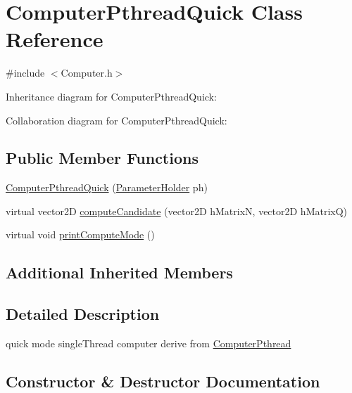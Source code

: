 \hypertarget{classComputerPthreadQuick}{}\section{Computer\+Pthread\+Quick Class Reference}
\label{classComputerPthreadQuick}


{\ttfamily \#include $<$Computer.\+h$>$}



Inheritance diagram for Computer\+Pthread\+Quick\+:


Collaboration diagram for Computer\+Pthread\+Quick\+:
\subsection*{Public Member Functions}
\begin{DoxyCompactItemize}
\item 
\hyperlink{classComputerPthreadQuick_adfe72929f368333d6ab5ef4158f06dbf}{Computer\+Pthread\+Quick} (\hyperlink{structParameterHolder}{Parameter\+Holder} ph)
\item 
virtual vector2D \hyperlink{classComputerPthreadQuick_a30dcb1ef65a0685d2cc4e112e40a8299}{compute\+Candidate} (vector2D h\+MatrixN, vector2D h\+MatrixQ)
\item 
virtual void \hyperlink{classComputerPthreadQuick_afe5a032d63598e7e2080bf2e513f93db}{print\+Compute\+Mode} ()
\end{DoxyCompactItemize}
\subsection*{Additional Inherited Members}


\subsection{Detailed Description}
quick mode single\+Thread computer derive from \hyperlink{classComputerPthread}{Computer\+Pthread} 

\subsection{Constructor \& Destructor Documentation}

